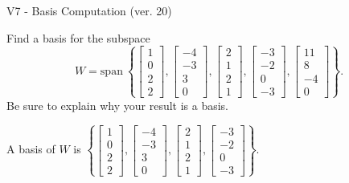 \begin{exercise}
  \begin{exerciseTitle}V7 - Basis Computation (ver. 20)\end{exerciseTitle}
  \begin{exerciseStatement}
    Find a basis for the subspace 
\[W=\mathrm{span}\ \left\{\left[\begin{array}{r}
1 \\
0 \\
2 \\
2
\end{array}\right] , \left[\begin{array}{r}
-4 \\
-3 \\
3 \\
0
\end{array}\right] , \left[\begin{array}{r}
2 \\
1 \\
2 \\
1
\end{array}\right] , \left[\begin{array}{r}
-3 \\
-2 \\
0 \\
-3
\end{array}\right] , \left[\begin{array}{r}
11 \\
8 \\
-4 \\
0
\end{array}\right]\right\}.\]
 Be sure to explain why your result is a basis.


  \end{exerciseStatement}
  \begin{exerciseAnswer}
   A basis of \(W\) is  \(\left\{\left[\begin{array}{r}
1 \\
0 \\
2 \\
2
\end{array}\right] , \left[\begin{array}{r}
-4 \\
-3 \\
3 \\
0
\end{array}\right] , \left[\begin{array}{r}
2 \\
1 \\
2 \\
1
\end{array}\right] , \left[\begin{array}{r}
-3 \\
-2 \\
0 \\
-3
\end{array}\right]\right\}\).
  


  \end{exerciseAnswer}
\end{exercise}